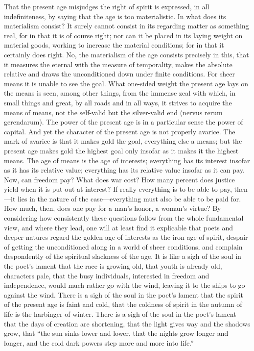 \documentclass[12pt]{book}
\newcommand{\opage}[1]{\marginnote{\footnotesize\textit{[#1]}}}
\begin{document}
That the present age misjudges the right of spirit is expressed, in all
indefiniteness, by saying that the age is too materialistic. In what
does its materialism consist? It surely cannot consist in its regarding
matter as something real, for in that it is of course right; nor can it
be placed in its laying weight on material goods, working to increase
the material conditions; for in that it certainly does right. No, the
materialism of the age consists
\opage{5}\setcounter{footnote}{0}%
precisely in this, that it measures the eternal with the measure of
temporality, makes the absolute relative and draws the unconditioned
down under finite conditions. For sheer means it is unable to see the
goal. What one-sided weight the present age lays on the means is seen,
among other things, from the immense zeal with which, in small things
and great, by all roads and in all ways, it strives to acquire the
means of means, not the self-valid but the silver-valid end (nervus
rerum gerendarum).
The power of the present age is in a particular sense the power of
capital. And yet the character of the present age is not properly
avarice. The mark of avarice is that it makes gold the goal, everything
else a means; but the present age makes gold the highest goal only
insofar as it makes it the highest means. The age of means is the age
of interests; everything has its interest insofar as it has its relative
value; everything has its relative value insofar as it can pay. Now, can
freedom pay? What does war cost? How many percent does justice yield
when it is put out at interest? If really everything is to be able to
pay, then---it lies in the nature of the case---everything must also be
able to be paid for. How much, then, does one pay for a man's honor, a
woman's virtue? By considering how consistently these questions follow
from the whole fundamental view, and where they lead, one will at least
find it explicable that poets and deeper natures regard the golden age of
interests as the iron age of spirit, despair of getting the
unconditioned along in a world of sheer conditions, and complain
despondently of the spiritual slackness of the age. It is like a sigh of
the soul in the poet's lament that the race is growing old, that youth
is already old, characters pale, that the busy individuals, interested
in freedom and independence, would much rather go with the wind, leaving
it to the ships to go against the wind. There
\opage{6}\setcounter{footnote}{0}%
is a sigh of the soul in the poet's lament that the spirit of the
present age is faint and cold, that the coldness of spirit in the autumn
of life is the harbinger of winter. There is a sigh of the soul in the
poet's lament that the days of creation are shortening, that the light
gives way and the shadows grow, that ``the sun sinks lower and lower,
that the nights grow longer and longer, and the cold dark powers step
more and more into life.''
\end{document}
